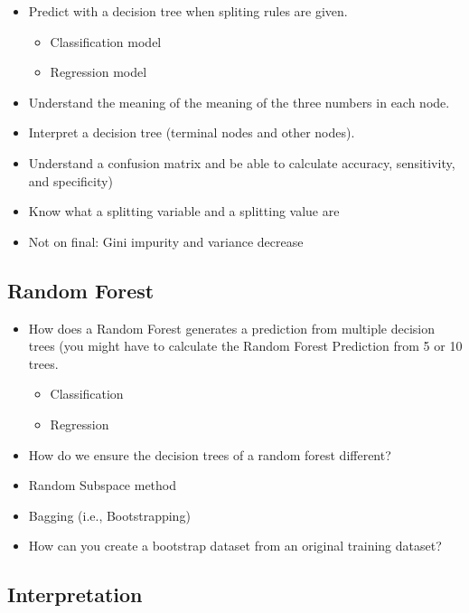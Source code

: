 \documentclass[
  letterpaper,
  DIV=11,
  numbers=noendperiod]{scrartcl}
\providecommand{\tightlist}{%
  \setlength{\itemsep}{0pt}\setlength{\parskip}{0pt}}\usepackage{longtable,booktabs,array}
\begin{document}
\begin{itemize}
\item
  Predict with a decision tree when spliting rules are given.

  \begin{itemize}
  \tightlist
  \item
    Classification model
  \item
    Regression model
  \end{itemize}
\item
  Understand the meaning of the meaning of the three numbers in each
  node.
\item
  Interpret a decision tree (terminal nodes and other nodes).
\item
  Understand a confusion matrix and be able to calculate accuracy,
  sensitivity, and specificity)
\item
  Know what a splitting variable and a splitting value are
\item
  Not on final: Gini impurity and variance decrease
\end{itemize}

\hypertarget{random-forest}{%
\subsection{Random Forest}\label{random-forest}}

\begin{itemize}
\item
  How does a Random Forest generates a prediction from multiple decision
  trees (you might have to calculate the Random Forest Prediction from 5
  or 10 trees.

  \begin{itemize}
  \tightlist
  \item
    Classification
  \item
    Regression
  \end{itemize}
\item
  How do we ensure the decision trees of a random forest different?
\item
  Random Subspace method
\item
  Bagging (i.e., Bootstrapping)
\item
  How can you create a bootstrap dataset from an original training
  dataset?
\end{itemize}

\hypertarget{interpretation}{%
\subsection{Interpretation}\label{interpretation}}
\end{document}
